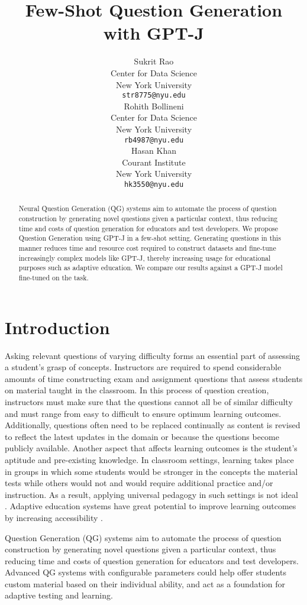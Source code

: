 \documentclass[11pt]{article}
\title{Few-Shot Question Generation with GPT-J}
\author{Sukrit Rao \\
  Center for Data Science \\
  New York University \\
  \texttt{str8775@nyu.edu} \\\And
  Rohith Bollineni \\
  Center for Data Science \\
  New York University \\
  \texttt{rb4987@nyu.edu} \\\And
  Hasan Khan \\
  Courant Institute \\ 
  New York University \\
  \texttt{hk3550@nyu.edu} \\}
\begin{document}
\maketitle
\begin{abstract}
Neural Question Generation (QG) systems aim to automate the process of question construction by generating novel questions given a particular context, thus reducing time and costs of question generation for educators and test developers. We propose Question Generation using GPT-J in a few-shot setting. Generating questions in this manner reduces time and resource cost required to construct datasets and fine-tune increasingly complex models like GPT-J, thereby increasing usage for educational purposes such as adaptive education. We compare our results against a GPT-J model fine-tuned on the task. 
\end{abstract}

\section{Introduction}

Asking relevant questions of varying difficulty forms an essential part of assessing a student’s grasp of concepts. Instructors are required to spend considerable amounts of time constructing exam and assignment questions that assess students on material taught in the classroom.
In this process of question creation, instructors must make sure that the questions cannot all be of similar difficulty and must range from easy to difficult to ensure optimum learning outcomes. Additionally, questions often need to be replaced continually as content is revised to reflect the latest updates in the domain or because the questions become publicly available. Another aspect that affects learning outcomes is the student's aptitude and pre-existing knowledge. In classroom settings, learning takes place in groups in which some students would be stronger in the concepts the material tests while others would not and would require additional practice and/or instruction. As a result, applying universal pedagogy in such settings is not ideal \citep{personalized-learning:9}.  Adaptive education systems have great potential to improve learning outcomes by increasing accessibility \citep{adaptive-education:8}. 

Question Generation (QG) systems \citep{nqg:15} aim to automate the process of question construction by generating novel questions given a particular context, thus reducing time and costs of question generation for educators and test developers. Advanced QG systems with configurable parameters could help offer students custom material based on their individual ability, and act as a foundation for adaptive testing and learning. 
\end{document}
